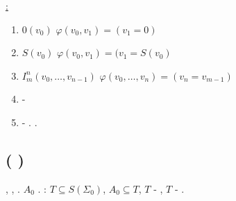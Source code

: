 \uline{\textcyr{\CYRD\cyro\cyrk\cyra\cyrz\cyra\cyrt\cyre\cyrl\cyrsftsn\cyrs\cyrt\cyrv\cyro}:}
\begin{enumerate}
\item $0(v_{0})$ \textcyr{\cyrp\cyrr\cyre\cyrd\cyrs\cyrt\cyra\cyrv\cyri\cyrm\cyra}
\textcyr{\cyrf\cyro\cyrr\cyrm\cyru\cyrl\cyro\cyrishrt} $\varphi(v_{0},v_{1})=(v_{1}=0)$
\item $S(v_{0})$ \textcyr{\cyrp\cyrr\cyre\cyrd\cyrs\cyrt\cyra\cyrv\cyri\cyrm\cyra}
\textcyr{\cyrf\cyro\cyrr\cyrm\cyru\cyrl\cyro\cyrishrt} $\varphi(v_{0},v_{1})=(v_{1}=S(v_{0})$
\item $I_{m}^{n}(v_{0},\dots,v_{n-1})$ \textcyr{\cyrp\cyrr\cyre\cyrd\cyrs\cyrt\cyra\cyrv\cyri\cyrm\cyra}
\textcyr{\cyrf\cyro\cyrr\cyrm\cyru\cyrl\cyro\cyrishrt} $\varphi(v_{0},\dots,v_{n})=(v_{n}=v_{m-1})$
\item \textcyr{\CYRS\cyru\cyrp\cyre\cyrr\cyrp\cyro\cyrz\cyri\cyrc\cyri\cyrya}
- \textcyr{\cyru\cyrp\cyrr\cyra\cyrzh\cyrn\cyre\cyrn\cyri\cyre}
\item \textcyr{\CYRO\cyrs\cyrt\cyra\cyrl\cyrsftsn\cyrn\cyro\cyre} - \textcyr{\cyrb}.
\textcyr{\cyrd}.
\end{enumerate}

\subsection{\textcyr{\CYRT\cyre\cyro\cyrr\cyre\cyrm\cyra} (\textcyr{\CYRG\cyryo\cyrd\cyre\cyrl\cyrya}
\textcyr{\cyro} \textcyr{\cyrn\cyre\cyrr\cyra\cyrz\cyrr\cyre\cyrsh\cyri\cyrm\cyro\cyrs\cyrt\cyri})}

\textcyr{\CYRL\cyryu\cyrb\cyra\cyrya} \textcyr{\cyrn\cyre\cyrp\cyrr\cyro\cyrt\cyri\cyrv\cyro\cyrr\cyre\cyrch\cyri\cyrv\cyra\cyrya}
\textcyr{\cyrt\cyre\cyro\cyrr\cyri\cyrya}, \textcyr{\cyrs\cyro\cyrd\cyre\cyrr\cyrzh\cyra\cyrshch\cyra\cyrya}
\textcyr{\cyra\cyrr\cyri\cyrf\cyrm\cyre\cyrt\cyri\cyrk\cyru} \textcyr{\CYRP\cyre\cyra\cyrn\cyro},
\textcyr{\cyrya\cyrv\cyrl\cyrya\cyre\cyrt\cyrs\cyrya} \textcyr{\cyrn\cyre\cyrr\cyra\cyrz\cyrr\cyre\cyrsh\cyri\cyrm\cyro\cyrishrt}.
\textcyr{\CYRI\cyrl\cyri} \textcyr{\cyrs\cyri\cyrs\cyrt\cyre\cyrm\cyra}
\textcyr{\cyra\cyrk\cyrs\cyri\cyro\cyrm} $A_{0}$ \textcyr{\cyrya\cyrv\cyrl\cyrya\cyre\cyrt\cyrs\cyrya}
\textcyr{\cyrn\cyra\cyrs\cyrl\cyrd\cyre\cyrs\cyrt\cyrv\cyre\cyrn\cyrn\cyro\cyre}
\textcyr{\cyrn\cyre\cyrr\cyra\cyrz\cyrr\cyre\cyrsh\cyri\cyrm\cyro\cyrishrt}.
\textcyr{\CYRA} \textcyr{\cyri\cyrm\cyre\cyrn\cyrn\cyro}: \textcyr{\cyrp\cyru\cyrs\cyrt\cyrsftsn}
$T\subseteq S(\Sigma_{0})$, $A_{0}\subseteq T$, $T$ - \textcyr{\cyrn\cyre\cyrp\cyrr\cyro\cyrt\cyri\cyrv\cyro\cyrr\cyre\cyrch\cyri\cyrv\cyra},
\textcyr{\cyrt\cyro\cyrg\cyrd\cyra} $T$ - \textcyr{\cyrn\cyre\cyrr\cyra\cyrz\cyrr\cyre\cyrsh\cyri\cyrm\cyra}.

